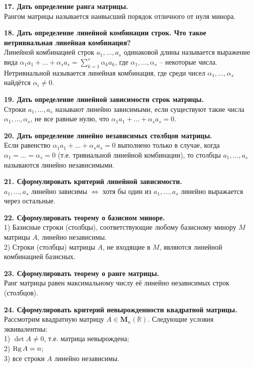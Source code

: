 \documentclass[11pt,a4paper]{article}
\newcommand{\R}{\mathbb{R}}
\newcommand{\Rg}[1]{\mathrm{Rg}\hspace{0.5mm}#1}
\begin{document}
\textbf{17. Дать определение ранга матрицы.\\}
Рангом матрицы называется наивысший порядок отличного от нуля минора.

\textbf{18. Дать определение линейной комбинации строк. Что такое нетривиальная линейная комбинация?\\}
Линейной комбинацией строк $a_1, \hdots, a_s$ одинаковой длины называется выражение вида $\alpha_1 a_1 + \hdots + \alpha_s a_s = \sum_{k = 1}^s \alpha_k a_k$, где $\alpha_1, \hdots, \alpha_s$ -- некоторые числа.\\
Нетривиальной называется линейная комбинация, где среди чисел $\alpha_1, \hdots, \alpha_s$ найдётся $\alpha_i \neq 0$.

\textbf{19. Дать определение линейной зависимости строк матрицы.\\}
Строки $a_1, \hdots, a_s$ называют линейно зависимыми, если существуют такие числа $\alpha_1, \hdots, \alpha_s$, не все равные нулю, что $\alpha_1 a_1 + \hdots + \alpha_s a_s = 0$.

\textbf{20. Дать определение линейно независимых столбцов матрицы.\\}
Если равенство $\alpha_1 a_1 + \hdots + \alpha_s a_s = 0$ выполнено только в случае, когда $\alpha_1 = \hdots = \alpha_s = 0$ (т.е. тривиальной линейной комбинации), то столбцы $a_1, \hdots, a_s$ называются линейно независимыми.

\textbf{21. Сформулировать критерий линейной зависимости.\\}
$a_1, \hdots, a_s$ линейно зависимы $\Leftrightarrow$ хотя бы один из $a_1, \hdots, a_s$ линейно выражается через остальные.

\textbf{22. Сформулировать теорему о базисном миноре.\\}
1) Базисные строки (столбцы), соответствующие любому базисному минору $M$ матрицы $A$, линейно независимы.\\
2) Строки (столбцы) матрицы $A$, не входящие в $M$, являются линейной комбинацией базисных.

\textbf{23. Сформулировать теорему о ранге матрицы.\\}
Ранг матрицы равен максимальному числу её линейно независимых строк (столбцов).

\textbf{24. Сформулировать критерий невырожденности квадратной матрицы.\\}
Рассмотрим квадратную матрицу $A \in \mathbf{M}_n( \R )$. Следующие условия эквивалентны:\\
1) $\det A \neq 0$, т.е. матрица невырождена;\\
2) $\Rg A = n$;\\
3) все строки $A$ линейно независимы.
\end{document}
